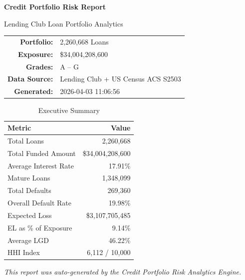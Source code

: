 \documentclass[11pt, a4paper]{article}
\begin{document}
\begin{titlepage}
\centering
\vspace*{2cm}

{{\Huge\bfseries\color{blue!60!black} Credit Portfolio Risk Report\par}}

\vspace{0.5cm}
{{\Large Lending Club Loan Portfolio Analytics\par}}

\vspace{1.5cm}

\begin{tabular}{r l}
\textbf{Portfolio:}   & 2,260,668 Loans \\
\textbf{Exposure:}    & \$34,004,208,600 \\
\textbf{Grades:}      & A -- G \\
\textbf{Data Source:} & Lending Club + US Census ACS S2503 \\
\textbf{Generated:}   & 2026-04-03 11:06:56 \\
\end{tabular}

\vspace{1.5cm}

\begin{table}[H]
\centering
\caption{Executive Summary}
\begin{tabular}{l r}
\toprule
\textbf{Metric} & \textbf{Value} \\
\midrule
Total Loans & 2,260,668 \\
Total Funded Amount & \$34,004,208,600 \\
Average Interest Rate & 17.91\% \\
Mature Loans & 1,348,099 \\
Total Defaults & 269,360 \\
Overall Default Rate & 19.98\% \\
Expected Loss & \$3,107,705,485 \\
EL as \% of Exposure & 9.14\% \\
Average LGD & 46.22\% \\
HHI Index & 6,112 / 10,000 \\
\bottomrule
\end{tabular}
\label{tab:summary}
\end{table}

\vfill
{\small\textit{This report was auto-generated by the Credit Portfolio Risk Analytics Engine.}}
\end{titlepage}
\end{document}
